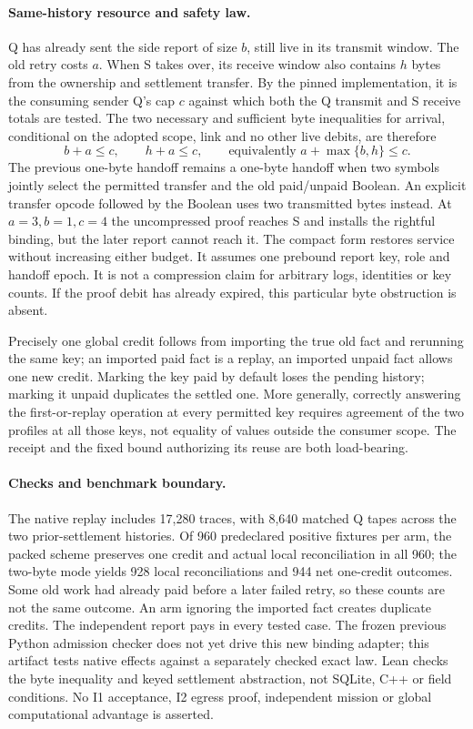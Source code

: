 \documentclass{article}
\begin{document}
\paragraph{Same-history resource and safety law.}
Q has already sent the side report of size \(b\), still live in
its transmit window. The old retry costs \(a\). When S takes over,
its receive window also contains \(h\) bytes from the ownership
and settlement transfer. By the pinned implementation, it is
the consuming sender Q's cap \(c\) against which both the
Q transmit and S receive totals are tested. The two necessary
and sufficient byte inequalities for arrival, conditional on
the adopted scope, link and no other live debits, are therefore
\[
           b+a\le c,\qquad h+a\le c,
   \qquad\text{equivalently } a+\max\{b,h\}\le c.
\]
The previous one-byte handoff remains a one-byte handoff
when two symbols jointly select the permitted transfer and
the old paid/unpaid Boolean. An explicit transfer opcode followed
by the Boolean uses two transmitted bytes instead.
At \(a=3,b=1,c=4\) the uncompressed proof reaches S and installs
the rightful binding, but the later report cannot reach it.
The compact form restores service without increasing either
budget. It assumes one prebound report key, role and handoff
epoch. It is not a compression claim for arbitrary logs,
identities or key counts. If the proof debit has already expired,
this particular byte obstruction is absent.

Precisely one global credit follows from importing the true
old fact and rerunning the same key; an imported paid fact is
a replay, an imported unpaid fact allows one new credit.
Marking the key paid by default loses the pending history;
marking it unpaid duplicates the settled one. More generally,
correctly answering the first-or-replay operation at every
permitted key requires agreement of the two profiles at all
those keys, not equality of values outside the consumer scope.
The receipt and the fixed bound authorizing its reuse are
both load-bearing.

\paragraph{Checks and benchmark boundary.}
The native replay includes 17,280 traces, with 8,640
matched Q tapes across the two prior-settlement histories.
Of 960 predeclared positive fixtures per arm, the packed
scheme preserves one credit and actual local reconciliation
in all 960; the two-byte mode yields 928 local reconciliations
and 944 net one-credit outcomes. Some old work had already
paid before a later failed retry, so these counts are not
the same outcome. An arm ignoring the imported fact
creates duplicate credits. The independent report pays
in every tested case. The frozen previous Python admission
checker does not yet drive this new binding adapter; this
artifact tests native effects against a separately checked
exact law. Lean checks the byte inequality and keyed
settlement abstraction, not SQLite, C++ or field conditions.
No I1 acceptance, I2 egress proof, independent mission or
global computational advantage is asserted.
\end{document}
